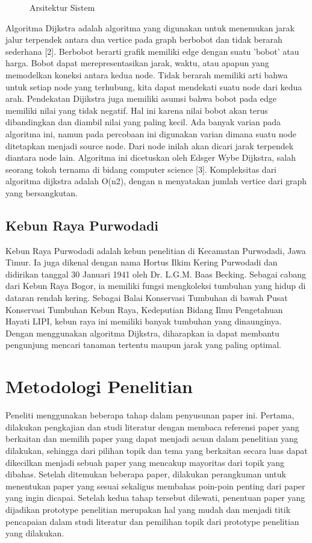 \documentclass[conference]{IEEEtran}
\begin{document}
        \begin{figure}[htbp]
            \centering
            \scalebox{0.4}{}
            \caption{Arsitektur Sistem}
        \end{figure}

        Algoritma Dijkstra adalah algoritma yang digunakan untuk menemukan jarak jalur terpendek antara dua vertice pada graph berbobot dan tidak berarah sederhana [2]. Berbobot berarti grafik memiliki edge dengan suatu 'bobot' atau harga. Bobot dapat merepresentasikan jarak, waktu, atau apapun yang memodelkan koneksi antara kedua node. Tidak berarah memiliki arti bahwa untuk setiap node yang terhubung, kita dapat mendekati suatu node dari kedua arah. Pendekatan Dijikstra juga memiliki asumsi bahwa bobot pada edge memiliki nilai yang tidak negatif. Hal ini karena nilai bobot akan terus dibandingkan dan diambil nilai yang paling kecil. Ada banyak varian pada algoritma ini, namun pada percobaan ini digunakan varian dimana suatu node ditetapkan menjadi source node. Dari node inilah akan dicari jarak terpendek diantara node lain. Algoritma ini dicetuskan oleh Edsger Wybe Dijkstra, salah seorang tokoh ternama di bidang computer science [3]. Kompleksitas dari algoritma dijkstra adalah O(n2), dengan n menyatakan jumlah vertice dari graph yang bersangkutan.

    \subsection{Kebun Raya Purwodadi}
        Kebun Raya Purwodadi adalah kebun penelitian di Kecamatan Purwodadi, Jawa Timur. Ia juga dikenal dengan nama Hortus Ilkim Kering Purwodadi dan didirikan tanggal 30 Januari 1941 oleh Dr. L.G.M. Baas Becking. Sebagai cabang dari Kebun Raya Bogor, ia memiliki fungsi mengkoleksi tumbuhan yang hidup di dataran rendah kering. Sebagai Balai Konservasi Tumbuhan di bawah Pusat Konservasi Tumbuhan Kebun Raya, Kedeputian Bidang Ilmu Pengetahuan Hayati LIPI, kebun raya ini memiliki banyak tumbuhan yang dinaunginya. Dengan menggunakan algoritma Dijkstra, diharapkan ia dapat membantu pengunjung mencari tanaman tertentu maupun jarak yang paling optimal.
    
\section{Metodologi Penelitian}
Peneliti menggunakan beberapa tahap dalam penyusunan paper ini. Pertama, dilakukan pengkajian dan studi literatur dengan membaca referensi paper yang berkaitan dan memilih paper yang dapat menjadi acuan dalam penelitian yang dilakukan, sehingga dari pilihan topik dan tema yang berkaitan secara luas dapat dikecilkan menjadi sebuah paper yang mencakup mayoritas dari topik yang dibahas. Setelah ditemukan beberapa paper, dilakukan perangkuman untuk menentukan paper yang sesuai sekaligus membahas poin-poin penting dari paper yang ingin dicapai. Setelah kedua tahap tersebut dilewati, penentuan paper yang dijadikan prototype penelitian merupakan hal yang mudah dan menjadi titik pencapaian dalam studi literatur dan pemilihan topik dari prototype penelitian yang dilakukan.
\end{document}

